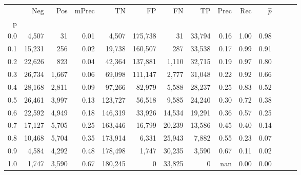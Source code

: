 \begin{tabular}{rrrrrrrrrrrrrr}
\toprule
{} &     Neg &    Pos & mPrec &       TN &       FP &      FN &      TP &  Prec &   Rec & $\hat{p}$ \\
p   &         &        &       &          &          &         &         &       &       &           \\
\midrule
0.0 &   4,507 &     31 &  0.01 &    4,507 &  175,738 &      31 &  33,794 &  0.16 &  1.00 &      0.98 \\
0.1 &  15,231 &    256 &  0.02 &   19,738 &  160,507 &     287 &  33,538 &  0.17 &  0.99 &      0.91 \\
0.2 &  22,626 &    823 &  0.04 &   42,364 &  137,881 &   1,110 &  32,715 &  0.19 &  0.97 &      0.80 \\
0.3 &  26,734 &  1,667 &  0.06 &   69,098 &  111,147 &   2,777 &  31,048 &  0.22 &  0.92 &      0.66 \\
0.4 &  28,168 &  2,811 &  0.09 &   97,266 &   82,979 &   5,588 &  28,237 &  0.25 &  0.83 &      0.52 \\
0.5 &  26,461 &  3,997 &  0.13 &  123,727 &   56,518 &   9,585 &  24,240 &  0.30 &  0.72 &      0.38 \\
0.6 &  22,592 &  4,949 &  0.18 &  146,319 &   33,926 &  14,534 &  19,291 &  0.36 &  0.57 &      0.25 \\
0.7 &  17,127 &  5,705 &  0.25 &  163,446 &   16,799 &  20,239 &  13,586 &  0.45 &  0.40 &      0.14 \\
0.8 &  10,468 &  5,704 &  0.35 &  173,914 &    6,331 &  25,943 &   7,882 &  0.55 &  0.23 &      0.07 \\
0.9 &   4,584 &  4,292 &  0.48 &  178,498 &    1,747 &  30,235 &   3,590 &  0.67 &  0.11 &      0.02 \\
1.0 &   1,747 &  3,590 &  0.67 &  180,245 &        0 &  33,825 &       0 &   nan &  0.00 &      0.00 \\
\bottomrule
\end{tabular}

